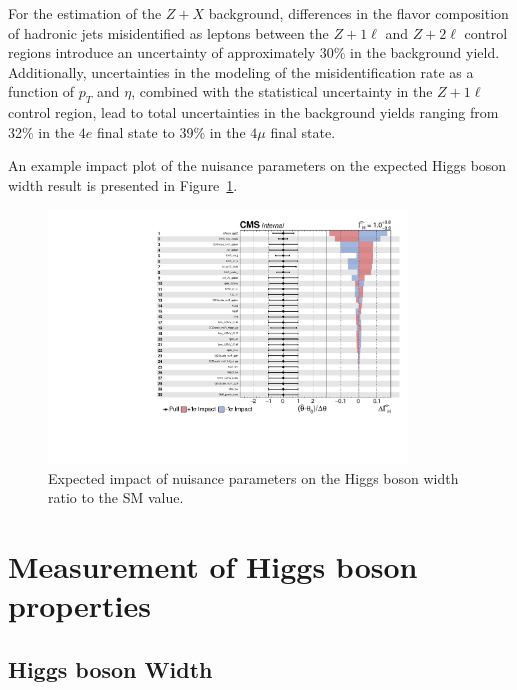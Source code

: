 For the estimation of the $Z + X$ background, differences in the flavor composition of hadronic jets misidentified as leptons between the $Z + 1\ell$ and $Z + 2\ell$ control regions introduce an uncertainty of approximately 30\% in the background yield. Additionally, uncertainties in the modeling of the misidentification rate as a function of $p_T$ and $\eta$, combined with the statistical uncertainty in the $Z + 1\ell$ control region, lead to total uncertainties in the background yields ranging from 32\% in the $4e$ final state to 39\% in the $4\mu$ final state.

An example impact plot of the nuisance parameters on the expected Higgs boson width result is presented in Figure~\ref{fig:impact}.

\begin{figure}[!hbt]
\begin{center}
\includegraphics[width=0.85\textwidth]{figures/impacts_all.pdf}
\caption
{
Expected impact of nuisance parameters on the Higgs boson width ratio to the SM value.
\label{fig:impact}
}
\end{center}
\end{figure}

\section{Measurement of Higgs boson properties} \label{sec:results}

\subsection{Higgs boson Width} \label{sec:offshellwidth}


